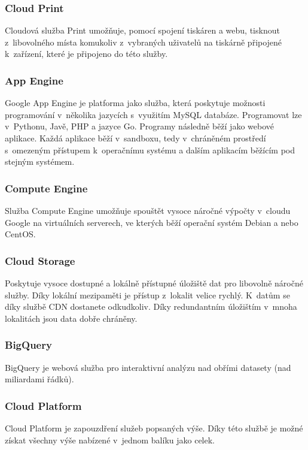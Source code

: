 \subsubsection{Cloud Print}
Cloudová služba Print umožňuje, pomocí spojení tiskáren a webu, tisknout z~libovolného místa komukoliv z~vybraných uživatelů na tiskárně připojené k~zařízení, které je připojeno do této služby.

\subsubsection{App Engine}
\label{sec:googleAppEngine}
Google App Engine je platforma jako služba, která poskytuje možnosti programování v~několika jazycích s~využitím MySQL databáze. Programovat lze v~Pythonu, Javě, PHP a jazyce Go. Programy následně běží jako webové aplikace. Každá aplikace běží v~sandboxu, tedy v~chráněném prostředí s~omezeným přístupem k~operačnímu systému a dalším aplikacím běžícím pod stejným systémem.

\subsubsection{Compute Engine}
Služba Compute Engine umožňuje spouštět vysoce náročné výpočty v~cloudu Google na virtuálních serverech, ve kterých běží operační systém Debian a nebo CentOS.

\subsubsection{Cloud Storage}
Poskytuje vysoce dostupné a lokálně přístupné úložiště dat pro libovolně náročné služby. Díky lokální mezipaměti je přístup z~lokalit velice rychlý. K~datům se díky službě CDN dostanete odkudkoliv. Díky redundantním úložištím v~mnoha lokalitách jsou data dobře chráněny.

\subsubsection{BigQuery}
BigQuery je webová služba pro interaktivní analýzu nad obřími datasety (nad miliardami řádků).

\subsubsection{Cloud Platform}
Cloud Platform je zapouzdření služeb popsaných výše. Díky této službě je možné získat všechny výše nabízené v~jednom balíku jako celek.

